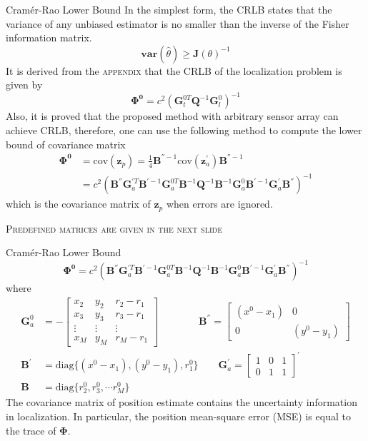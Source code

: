 \documentclass[10pt]{beamer}
\begin{document}
\begin{frame}{Cram\'{e}r-Rao Lower Bound}
  In the simplest form, the CRLB states that the variance of any unbiased estimator
  is no smaller than the inverse of the Fisher information matrix.
   $$\textbf{var}(\hat{\theta}) \geqslant \textbf{J}(\theta)^{-1} $$
  It is derived from the \textsc{appendix} that the CRLB of the localization problem
  is given by
   $$ \bm{\Phi^0} = c^2 (\textbf{G}_t^{0T} \textbf{Q}^{-1} \textbf{G}_l^0)^{-1} $$
  Also, it is proved that the proposed method with arbitrary sensor array can achieve CRLB,
  therefore, one can use the following method to compute the lower bound of covariance matrix
  \begin{align*}
    \boldsymbol{\Phi^0} &= \text{cov}(\textbf{z}_p) = \frac{1}{4} \textbf{B}^{''-1} \text{cov} (\textbf{z}_a^{'}) \textbf{B}^{''-1} \\
           &= c^2 ( \textbf{B}^{''} \textbf{G}_a^{'T} \textbf{B}^{'-1} \textbf{G}_a^{0T} \textbf{B}^{-1} \textbf{Q}^{-1} \textbf{B}^{-1} \textbf{G}_a^{0}  \textbf{B}^{'-1} \textbf{G}_a^{'} \textbf{B}^{''} )^{-1}
  \end{align*}
  which is the covariance matrix of $\textbf{z}_p$ when errors are ignored.
  \begin{center}
    \textsc{Predefined matrices are given in the next slide}
  \end{center}
\end{frame}
\begin{frame}{Cram\'{e}r-Rao Lower Bound}
  \begin{equation*}
    \boldsymbol{\Phi^0} = c^2 ( \textbf{B}^{''} \textbf{G}_a^{'T} \textbf{B}^{'-1} \textbf{G}_a^{0T} \textbf{B}^{-1} \textbf{Q}^{-1} \textbf{B}^{-1} \textbf{G}_a^{0}  \textbf{B}^{'-1} \textbf{G}_a^{'} \textbf{B}^{''} )^{-1}
  \end{equation*}
  where
  \begin{align*}
     \textbf{G}_a^0   &= - \begin{bmatrix} x_2  & y_2 & r_2-r_1 \\   x_3  & y_3 & r_3-r_1 \\ \vdots & \vdots & \vdots \\  x_M  & y_M & r_M-r_1 \end{bmatrix} \qquad \qquad
     \textbf{B}^{''}  = \begin{bmatrix} (x^0 - x_1) & 0 \\  0 & (y^0 - y_1)\end{bmatrix}\\
     \textbf{B}^{'}\  &= \text{diag}\{(x^0 - x_1),(y^0 - y_1),r_1^0\}\qquad
     \textbf{G}_a^{'} = \begin{bmatrix} 1 & 0 & 1 \\  0 & 1 & 1\end{bmatrix}^{'} \\
     \textbf{B}  \ \  &= \text{diag}\{r_2^0, r_3^0, \cdots r_M^0\}
   \end{align*}
   The covariance matrix of position estimate contains the uncertainty information in localization.
   In particular, the position mean-square error (\textsc{MSE}) is equal to the \alert{trace} of $\boldsymbol{\Phi}$.
\end{frame}
\end{document}
